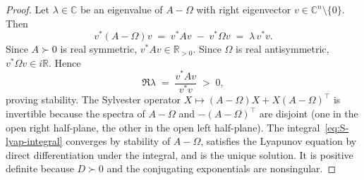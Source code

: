 \documentclass[10pt,a4paper]{amsart}
\newcommand{\RR}{\mathbb{R}}
\begin{document}
\begin{proof}
Let $\lambda \in \mathbb{C}$ be an eigenvalue of $A - \Omega$ with right eigenvector $v \in \mathbb{C}^n \setminus \{0\}$. Then
\[
v^* (A - \Omega) v \;=\; v^* A v \;-\; v^* \Omega v \;=\; \lambda\,v^* v.
\]
Since $A \succ 0$ is real symmetric, $v^* A v \in \RR_{>0}$. Since $\Omega$ is real antisymmetric, $v^* \Omega v \in i\RR$. Hence
\[
\Re \lambda \;=\; \frac{v^* A v}{v^* v} \;>\; 0,
\]
proving stability. The Sylvester operator $X \mapsto (A - \Omega) X + X (A - \Omega)^\top$ is invertible because the spectra of $A - \Omega$ and $-(A - \Omega)^\top$ are disjoint (one in the open right half-plane, the other in the open left half-plane). The integral~\eqref{eq:S-lyap-integral} converges by stability of $A - \Omega$, satisfies the Lyapunov equation by direct differentiation under the integral, and is the unique solution. It is positive definite because $D \succ 0$ and the conjugating exponentials are nonsingular.
\end{proof}
\end{document}
